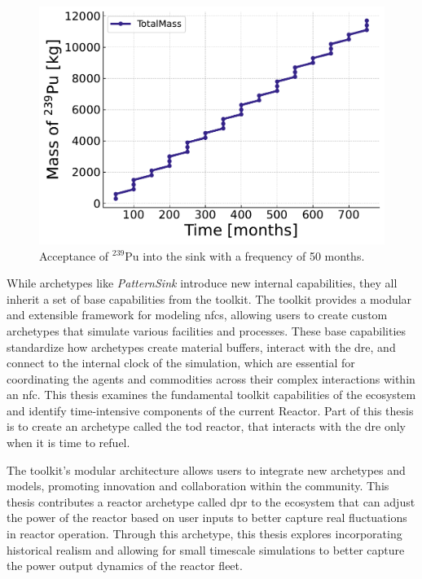 \begin{figure}[H]
    \centering
    \includegraphics[scale=0.7]{images/cyclus/pattern_sink_fuel_transactions.pdf}
    \caption{Acceptance of $^{239}$Pu into the sink with a frequency of 50 months.}
    \label{fig:pattern_freq_50}
\end{figure}

While archetypes like \textit{PatternSink} introduce new internal capabilities, they all inherit a set of base capabilities from the \cyclus toolkit. The \cyclus toolkit provides a modular and extensible framework for modeling \glspl{nfc}, allowing users to create custom archetypes that simulate various facilities and processes. These base capabilities standardize how archetypes create material buffers, interact with the \gls{dre}, and connect to the internal clock of the simulation, which are essential for coordinating the agents and commodities across their complex interactions within an \gls{nfc}. This thesis examines the fundamental toolkit capabilities of the \cyclus ecosystem and identify time-intensive components of the current \cycamore Reactor. Part of this thesis is to create an archetype called the \gls{tod} reactor, that interacts with the \gls{dre} only when it is time to refuel.

The toolkit’s modular architecture allows users to integrate new archetypes and models, promoting innovation and collaboration within the \cyclus community. This thesis contributes a reactor archetype called \gls{dpr} to the ecosystem that can adjust the power of the reactor based on user inputs to better capture real fluctuations in reactor operation. Through this archetype, this thesis explores incorporating historical realism and allowing for small timescale simulations to better capture the power output dynamics of the reactor fleet.

